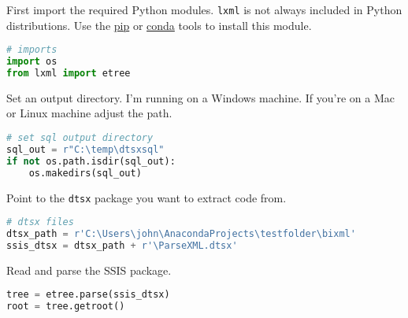 First import the required Python modules. \texttt{lxml} is not always
included in Python distributions. Use the
\href{https://remotedevdaily.com/how-to-install-lxml-in-python-using-pip/}{pip}
or \href{https://anaconda.org/anaconda/lxml}{conda} tools to install
this module.

\begin{tcolorbox}[breakable, size=fbox, boxrule=1pt, pad at break*=1mm,colback=cellbackground, colframe=cellborder]
\begin{lstlisting}[language=python, frame=single, framerule=0pt, label=lst:scr5673X0]
# imports
import os
from lxml import etree
\end{lstlisting}
\end{tcolorbox}

Set an output directory. I'm running on a Windows machine. If you're on
a Mac or Linux machine adjust the path.

\begin{tcolorbox}[breakable, size=fbox, boxrule=1pt, pad at break*=1mm,colback=cellbackground, colframe=cellborder]
\begin{lstlisting}[language=python, frame=single, framerule=0pt, label=lst:scr5673X1]
# set sql output directory
sql_out = r"C:\temp\dtsxsql"
if not os.path.isdir(sql_out):
    os.makedirs(sql_out)
\end{lstlisting}
\end{tcolorbox}


Point to the \texttt{dtsx} package you want to extract code from.

\begin{tcolorbox}[breakable, size=fbox, boxrule=1pt, pad at break*=1mm,colback=cellbackground, colframe=cellborder]
\begin{lstlisting}[language=python, frame=single, framerule=0pt, label=lst:scr5673X2]
# dtsx files
dtsx_path = r'C:\Users\john\AnacondaProjects\testfolder\bixml'
ssis_dtsx = dtsx_path + r'\ParseXML.dtsx'
\end{lstlisting}
\end{tcolorbox}


Read and parse the SSIS package.

\begin{tcolorbox}[breakable, size=fbox, boxrule=1pt, pad at break*=1mm,colback=cellbackground, colframe=cellborder]
\begin{lstlisting}[language=python, frame=single, framerule=0pt, label=lst:scr5673X3]
tree = etree.parse(ssis_dtsx)
root = tree.getroot()
\end{lstlisting}
\end{tcolorbox}


